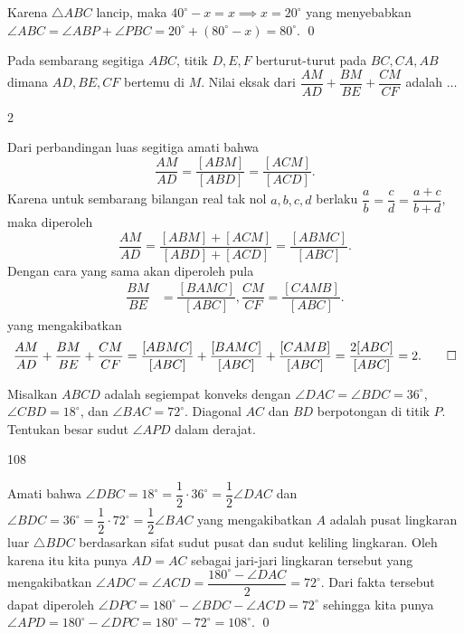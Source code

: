 \documentclass[12pt]{scrartcl}
\begin{document}
\begin{soalbaru}
\begin{solusi}
		Karena $\triangle ABC$ lancip, maka $40^\circ -x = x \implies x = 20^\circ$ yang menyebabkan $\angle ABC = \angle ABP + \angle PBC = 20^\circ + (80^\circ-x)=80^\circ.$ \qed
		\end{solusi}
	\end{soalbaru}
	
	\begin{soalbaru}
			Pada sembarang segitiga $ABC$, titik $D,E,F$ berturut-turut pada $BC,CA,AB$ dimana $AD,BE,CF$ bertemu di $M$. Nilai eksak dari $\dfrac{AM}{AD}+\dfrac{BM}{BE}+\dfrac{CM}{CF}$ adalah $\dots$
			
			\begin{jawaban}
			2
			\end{jawaban}
			\begin{solusi}
			Dari perbandingan luas segitiga amati bahwa $$\dfrac{AM}{AD}=\dfrac{[ABM]}{[ABD]}=\dfrac{[ACM]}{[ACD]}.$$
			Karena untuk sembarang bilangan real tak nol $a,b,c,d$ berlaku $\dfrac{a}{b}=\dfrac{c}{d}=\dfrac{a+c}{b+d}$, maka diperoleh $$\dfrac{AM}{AD}=\dfrac{[ABM]+[ACM]}{[ABD]+[ACD]}=\dfrac{[ABMC]}{[ABC]}.$$
			Dengan cara yang sama akan diperoleh pula 
			\begin{align*}
			\dfrac{BM}{BE}&=\dfrac{[BAMC]}{[ABC]},
			\dfrac{CM}{CF}=\dfrac{[CAMB]}{[ABC]}.
			\end{align*}
			yang mengakibatkan
			$$\dfrac{AM}{AD}+\dfrac{BM}{BE}+\dfrac{CM}{CF}=\dfrac{[ABMC]}{[ABC]}+\dfrac{[BAMC]}{[ABC]}+\dfrac{[CAMB]}{[ABC]}=\dfrac{2[ABC]}{[ABC]}=2.\qed$$
			\end{solusi}
		\end{soalbaru}
	\vspace{10pt}
	\begin{soalbaru}
		Misalkan $ABCD$ adalah segiempat konveks dengan $\angle DAC=\angle BDC = 36^\circ$, $\angle CBD = 18^\circ$, dan $\angle BAC = 72^\circ$. Diagonal $AC$ dan $BD$ berpotongan di titik $P$. Tentukan besar sudut $\angle APD$ dalam derajat. %
		\begin{jawaban}
		108
		\end{jawaban}
		\begin{solusi}
		Amati bahwa $\angle DBC = 18^\circ = \dfrac{1}{2}\cdot 36^\circ = \dfrac{1}{2} \angle DAC$ dan $\angle BDC = 36^\circ = \dfrac{1}{2}\cdot 72^\circ = \dfrac{1}{2}\angle BAC$ yang mengakibatkan $A$ adalah pusat lingkaran luar $\triangle BDC$ berdasarkan sifat sudut pusat dan sudut keliling lingkaran. Oleh karena itu kita punya $AD = AC$ sebagai jari-jari lingkaran tersebut yang mengakibatkan $\angle ADC = \angle ACD = \dfrac{180^\circ-\angle DAC}{2}=72^\circ$. Dari fakta tersebut dapat diperoleh $\angle DPC = 180^\circ - \angle BDC - \angle ACD = 72^\circ$ sehingga kita punya $\angle APD = 180^\circ - \angle DPC = 180^\circ - 72^\circ = 108^\circ.$ \qed
		\end{solusi}
	\end{soalbaru}
	
\end{document}
